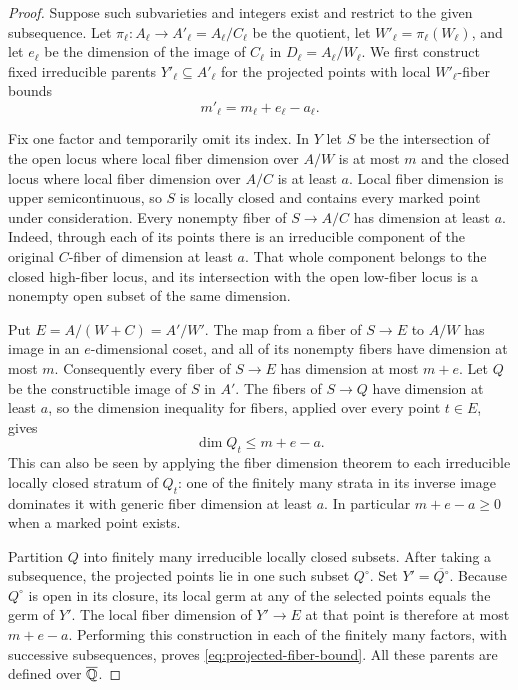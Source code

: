 \begin{proof}
Suppose such subvarieties and integers exist and restrict to the given
subsequence. Let $\pi_\ell:A_\ell\to A'_\ell=A_\ell/C_\ell$
be the quotient, let $W'_\ell=\pi_\ell(W_\ell)$, and let
$e_\ell$ be the dimension of the image of $C_\ell$ in
$D_\ell=A_\ell/W_\ell$. We first construct fixed irreducible
parents $Y'_\ell\subseteq A'_\ell$ for the projected points with
local $W'_\ell$-fiber bounds
\begin{equation}
 \label{eq:projected-fiber-bound}
 m'_\ell=m_\ell+e_\ell-a_\ell.
\end{equation}

Fix one factor and temporarily omit its index. In $Y$ let $S$ be the
intersection of the open locus where local fiber dimension over $A/W$
is at most $m$ and the closed locus where local fiber dimension over
$A/C$ is at least $a$. Local fiber dimension is upper semicontinuous,
so $S$ is locally closed and contains every marked point under
consideration. Every nonempty fiber of $S\to A/C$ has dimension at
least $a$. Indeed, through each of its points there is an irreducible
component of the original $C$-fiber of dimension at least $a$. That
whole component belongs to the closed high-fiber locus, and its
intersection with the open low-fiber locus is a nonempty open subset
of the same dimension.

Put $E=A/(W+C)=A'/W'$. The map from a fiber of $S\to E$ to
$A/W$ has image in an $e$-dimensional coset, and all of its nonempty
fibers have dimension at most $m$. Consequently every fiber of
$S\to E$ has dimension at most $m+e$. Let $Q$ be the constructible
image of $S$ in $A'$. The fibers of $S\to Q$ have dimension at least
$a$, so the dimension inequality for fibers, applied over every
point $t\in E$, gives
\[
 \dim Q_t\le m+e-a.
\]
This can also be seen by applying the fiber dimension theorem to
each irreducible locally closed stratum of $Q_t$: one of the finitely
many strata in its inverse image dominates it with generic fiber
dimension at least $a$. In particular $m+e-a\ge0$ when a marked
point exists.

Partition $Q$ into finitely many irreducible locally closed subsets.
After taking a subsequence, the projected points lie in one such
subset $Q^\circ$. Set $Y'=\overline{Q^\circ}$. Because
$Q^\circ$ is open in its closure, its local germ at any of the
selected points equals the germ of $Y'$. The local fiber dimension
of $Y'\to E$ at that point is therefore at most $m+e-a$. Performing
this construction in each of the finitely many factors, with
successive subsequences, proves \eqref{eq:projected-fiber-bound}.
All these parents are defined over $\overline{\mathbb Q}$.


\end{proof}
